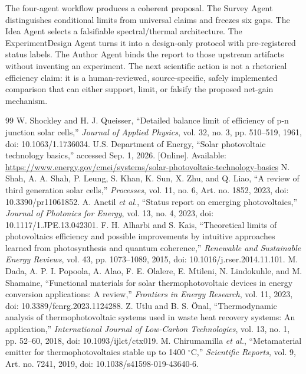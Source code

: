 \documentclass[conference]{../../../../Conference-LaTeX-template_10-17-19/IEEEtran}
\begin{document}
The four-agent workflow produces a coherent proposal. The Survey Agent distinguishes conditional limits from universal claims and freezes six gaps. The Idea Agent selects a falsifiable spectral/thermal architecture. The ExperimentDesign Agent turns it into a design-only protocol with pre-registered status labels. The Author Agent binds the report to those upstream artifacts without inventing an experiment. The next scientific action is not a rhetorical efficiency claim: it is a human-reviewed, source-specific, safely implemented comparison that can either support, limit, or falsify the proposed net-gain mechanism.

\balance
\begin{thebibliography}{99}
 W. Shockley and H. J. Queisser, ``Detailed balance limit of efficiency of p-n junction solar cells,'' \emph{Journal of Applied Physics}, vol. 32, no. 3, pp. 510--519, 1961, doi: 10.1063/1.1736034.
 U.S. Department of Energy, ``Solar photovoltaic technology basics,'' accessed Sep. 1, 2026. [Online]. Available: \url{https://www.energy.gov/cmei/systems/solar-photovoltaic-technology-basics}
 N. Shah, A. A. Shah, P. Leung, S. Khan, K. Sun, X. Zhu, and Q. Liao, ``A review of third generation solar cells,'' \emph{Processes}, vol. 11, no. 6, Art. no. 1852, 2023, doi: 10.3390/pr11061852.
 A. Anctil \emph{et al.}, ``Status report on emerging photovoltaics,'' \emph{Journal of Photonics for Energy}, vol. 13, no. 4, 2023, doi: 10.1117/1.JPE.13.042301.
 F. H. Alharbi and S. Kais, ``Theoretical limits of photovoltaics efficiency and possible improvements by intuitive approaches learned from photosynthesis and quantum coherence,'' \emph{Renewable and Sustainable Energy Reviews}, vol. 43, pp. 1073--1089, 2015, doi: 10.1016/j.rser.2014.11.101.
 M. Dada, A. P. I. Popoola, A. Alao, F. E. Olalere, E. Mtileni, N. Lindokuhle, and M. Shamaine, ``Functional materials for solar thermophotovoltaic devices in energy conversion applications: A review,'' \emph{Frontiers in Energy Research}, vol. 11, 2023, doi: 10.3389/fenrg.2023.1124288.
 Z. Utlu and B. S. \"Onal, ``Thermodynamic analysis of thermophotovoltaic systems used in waste heat recovery systems: An application,'' \emph{International Journal of Low-Carbon Technologies}, vol. 13, no. 1, pp. 52--60, 2018, doi: 10.1093/ijlct/ctx019.
 M. Chirumamilla \emph{et al.}, ``Metamaterial emitter for thermophotovoltaics stable up to 1400 $^\circ$C,'' \emph{Scientific Reports}, vol. 9, Art. no. 7241, 2019, doi: 10.1038/s41598-019-43640-6.

\end{thebibliography}
\end{document}
